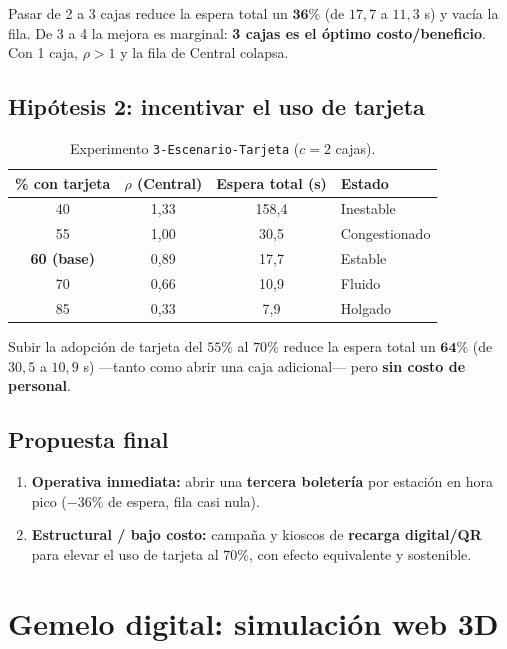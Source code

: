 \documentclass[11pt,a4paper]{article}
\newcommand{\code}[1]{\texttt{#1}}
\begin{document}
\noindent Pasar de 2 a 3 cajas reduce la espera total un $\mathbf{36\%}$ (de
$17{,}7$ a $11{,}3$ s) y vacía la fila. De 3 a 4 la mejora es marginal:
\textbf{3 cajas es el óptimo costo/beneficio}. Con 1 caja, $\rho>1$ y la fila de
Central colapsa.

\subsection{Hipótesis 2: incentivar el uso de tarjeta}
\begin{table}[h]
\centering
\caption{Experimento \code{3-Escenario-Tarjeta} ($c = 2$ cajas).}
\label{tab:tarjeta}
\begin{tabular}{cccl}
\toprule
\% con tarjeta & $\rho$ (Central) & Espera total (s) & Estado \\
\midrule
40 & 1{,}33 & 158{,}4 & Inestable \\
55 & 1{,}00 & 30{,}5 & Congestionado \\
\textbf{60 (base)} & 0{,}89 & 17{,}7 & Estable \\
70 & 0{,}66 & 10{,}9 & Fluido \\
85 & 0{,}33 & 7{,}9 & Holgado \\
\bottomrule
\end{tabular}
\end{table}

\noindent Subir la adopción de tarjeta del $55\%$ al $70\%$ reduce la espera total un
$\mathbf{64\%}$ (de $30{,}5$ a $10{,}9$ s) ---tanto como abrir una caja adicional---
pero \textbf{sin costo de personal}.

\subsection{Propuesta final}
\begin{enumerate}[nosep]
  \item \textbf{Operativa inmediata:} abrir una \textbf{tercera boletería} por
  estación en hora pico ($-36\%$ de espera, fila casi nula).
  \item \textbf{Estructural / bajo costo:} campaña y kioscos de \textbf{recarga
  digital/QR} para elevar el uso de tarjeta al $70\%$, con efecto equivalente y
  sostenible.
\end{enumerate}

\section{Gemelo digital: simulación web 3D}
\end{document}
